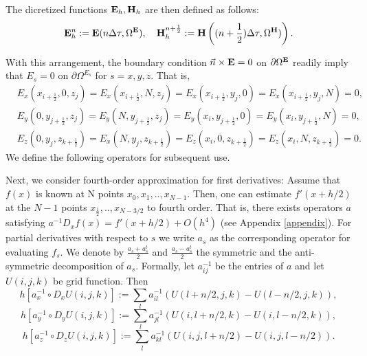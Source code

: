 \documentclass[12pt,reqno]{amsart}
\newcommand{\e}{{\bf E}}
\newcommand{\h}{{\bf H}}
\theoremstyle{definition}
\numberwithin{equation}{section}
\def\Gw{\Omega}     \def\Gx{\Xi}         \def\Gy{\Psi}
\begin{document}
    The dicretized functions $\e_h, \h_h$ are then defined as follows:
    $$
    \e_h^n:=\e(n\Delta \tau,\Gw^\e),\quad  \h_h^{n+\frac{1}{2}}:=\h\left ((n+\frac{1}{2})\Delta \tau,\Gw^\h)\right).
    $$

	With this arrangement, the boundary condition 
	$\vec{n}\times {\bf E}=0$ on $\partial \Gw^{{\bf E}}$ readily imply that 
	$E_s=0$ on $\partial \Gw^{E_s}$ for $s=x,y,z$. That is, 
	\begin{align*}
		&
		E_x(x_{i+\frac{1}{2}},0,z_j)=E_x(x_{i+\frac{1}{2}},N,z_j)=
		E_x(x_{i+\frac{1}{2}},y_j,0)=E_x(x_{i+\frac{1}{2}},y_j, N)=0, \\&
		E_y(0,y_{j+\frac{1}{2}},z_j)=E_y(N,y_{j+\frac{1}{2}},z_j)=
		E_y(x_i,y_{j+\frac{1}{2}},0)=E_y(x_i, y_{j+\frac{1}{2}}, N)=0, \\&
		E_z(0,y_j,z_{k+\frac{1}{2}})=E_x(N,y_j,z_{k+\frac{1}{2}})=
		E_z(x_i,0,z_{k+\frac{1}{2}})=E_z(x_i,N,z_{k+\frac{1}{2}})=0. &
	\end{align*} 
	We define the following operators for subsequent use.
	
	Next, we consider fourth-order approximation for first derivatives:
	Assume that $f(x)$ is known at N points $x_0,x_1, ..,x_{N-1}$. Then,  one can  estimate  $f'(x+h/2)$ at the $N-1$ points 	$x_{\frac{1}{2}},..,x_{N-3/2}$ to fourth order.
   That is, there exists operators $a$ satisfying $a^{-1}D_xf(x)=f'(x+h/2)+O(h^4)$
   (see Appendix \ref{appendix}). For partial derivatives with respect to $s$ we write $a_s$ as the corresponding operator for evaluating $f_s$. 
   We denote by $\frac{a_s+a_s^t}{2}$ and $\frac{a_s-a_s^t}{2}$ the symmetric and the anti-symmetric decomposition of $a_s$.
   Formally, let $a_{ij}^{-1}$ be the entries of $a$ and let $U(i,j,k)$ be grid function.
   Then 
 $$h[a_x^{-1}\circ D_xU(i,j,k)]:=\sum_{l} a_{il}^{-1}(U(l+n/2,j,k)-U(l-n/2,j,k)),$$
  $$h[a_y^{-1}\circ D_yU(i,j,k)]:=\sum_{l} a_{jl}^{-1}(U(i,l+n/2,k)-U(i,l-n/2,k)),$$
   $$h[a_z^{-1}\circ D_zU(i,j,k)]:=\sum_{l} a_{kl}^{-1}(U(i,j,l+n/2)-U(i,j,l-n/2)).$$
 
\end{document}
